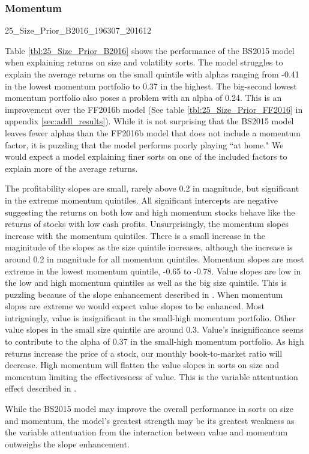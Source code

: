 
\subsubsection{Momentum}

{25_Size_Prior_B2016_196307_201612}

Table \ref{tbl:25_Size_Prior_B2016} shows the performance of the BS2015 model when
explaining returns on size and volatility sorts. The model struggles to explain the
average returns on the small quintile with alphas ranging from -0.41 in the lowest
momentum portfolio to 0.37 in the highest. The big-second lowest momentum portfolio also
poses a problem with an alpha of 0.24. This is an improvement over the FF2016b model (See
table \ref{tbl:25_Size_Prior_FF2016} in appendix \ref{sec:addl_results}). While it is not
surprising that the BS2015 model leaves fewer alphas than the FF2016b model that does not
include a momentum factor, it is puzzling that the model performs poorly playing ``at
home." We would expect a model explaining finer sorts on one of the included factors to
explain more of the average returns.

The profitability slopes are small, rarely above 0.2 in magnitude, but significant in the
extreme momentum quintiles. All significant intercepts are negative suggesting the returns
on both low and high momentum stocks behave like the returns of stocks with low cash
profits. Unsurprisingly, the momentum slopes increase with the momentum quintiles. There
is a small increase in the maginitude of the slopes as the size quintile increases,
although the increase is around 0.2 in magnitude for all momentum quintiles. Momentum
slopes are most extreme in the lowest momentum quintile, -0.65 to -0.78. Value slopes are
low in the low and high momentum quintiles as well as the big size quintile. This is
puzzling because of the slope enhancement described in \textcite{fama2015incremental}.
When momentum slopes are extreme we would expect value slopes to be enhanced. Most
intriguingly, value is insignificant in the small-high momentum portfolio. Other value
slopes in the small size quintile are around 0.3. Value's insignificance seems to
contribute to the alpha of 0.37 in the small-high momentum portfolio. As high returns
increase the price of a stock, our monthly book-to-market ratio will decrease. High
momentum will flatten the value slopes in sorts on size and momentum limiting the
effectivesness of value. This is the variable attentuation effect described in
\textcite{fama2015incremental}.

While the BS2015 model may improve the overall performance in sorts on size and momentum,
the model's greatest strength may be its greatest weakness as the variable attentuation
from the interaction between value and momentum outweighs the slope enhancement.

